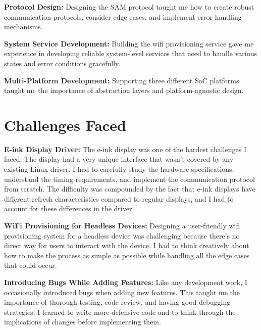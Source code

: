 \documentclass[12pt,a4paper]{report}
\begin{document}
\vspace{0.3cm}

\textbf{Protocol Design:} Designing the SAM protocol taught me how to create robust communication protocols, consider edge cases, and implement error handling mechanisms.

\vspace{0.3cm}

\textbf{System Service Development:} Building the wifi provisioning service gave me experience in developing reliable system-level services that need to handle various states and error conditions gracefully.

\vspace{0.3cm}

\textbf{Multi-Platform Development:} Supporting three different SoC platforms taught me the importance of abstraction layers and platform-agnostic design.

\section{Challenges Faced}

\textbf{E-ink Display Driver:} The e-ink display was one of the hardest challenges I faced. The display had a very unique interface that wasn't covered by any existing Linux driver. I had to carefully study the hardware specifications, understand the timing requirements, and implement the communication protocol from scratch. The difficulty was compounded by the fact that e-ink displays have different refresh characteristics compared to regular displays, and I had to account for these differences in the driver.

\vspace{0.3cm}

\textbf{WiFi Provisioning for Headless Devices:} Designing a user-friendly wifi provisioning system for a headless device was challenging because there's no direct way for users to interact with the device. I had to think creatively about how to make the process as simple as possible while handling all the edge cases that could occur.

\vspace{0.3cm}

\textbf{Introducing Bugs While Adding Features:} Like any development work, I occasionally introduced bugs when adding new features. This taught me the importance of thorough testing, code review, and having good debugging strategies. I learned to write more defensive code and to think through the implications of changes before implementing them.
\end{document}
